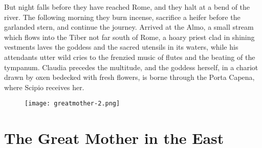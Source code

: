 \documentclass[a4paper, 11pt, oneside, polutonikogreek, english]{article}
\begin{document}
But night falls before they have reached Rome, and they halt at a bend of the river. The following morning they burn incense, sacrifice a heifer before the garlanded stern, and continue the journey. Arrived at the Almo, a small stream which flows into the Tiber not far south of Rome, a hoary priest clad in shining vestments laves the goddess and the sacred utensils in its waters, while his attendants utter wild cries to the frenzied music of flutes and the beating of the tympanum. Claudia precedes the multitude, and the goddess herself, in a chariot drawn by oxen bedecked with fresh flowers, is borne through the Porta Capena, where Scipio receives her.

\begin{figure}[H]
\centering
\texttt{[image: greatmother-2.png]}
\caption{}
\end{figure}

\clearpage
\section{The Great Mother in the East}
\end{document}
